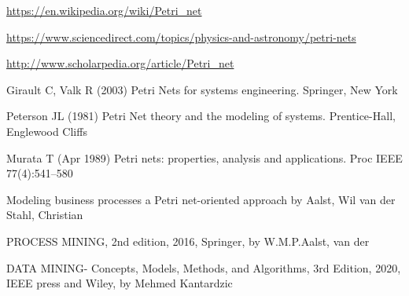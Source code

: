 \documentclass[a4paper]{article}
\begin{document}
\begin{thebibliography}{80}


\url{https://en.wikipedia.org/wiki/Petri_net}

\url{https://www.sciencedirect.com/topics/physics-and-astronomy/petri-nets}

\url{http://www.scholarpedia.org/article/Petri_net}

Girault C, Valk R (2003) Petri Nets for systems engineering. Springer, New York

Peterson JL (1981) Petri Net theory and the modeling of systems. Prentice-Hall, Englewood Cliffs

Murata T (Apr 1989) Petri nets: properties, analysis and applications. Proc IEEE 77(4):541–580

Modeling business processes a Petri net-oriented approach by Aalst, Wil van der Stahl, Christian

PROCESS MINING, 2nd edition, 2016, Springer, by W.M.P.Aalst, van der

DATA MINING- Concepts, Models, Methods, and Algorithms,
3rd Edition, 2020, IEEE press and Wiley, by Mehmed Kantardzic

\end{thebibliography}
\end{document}
